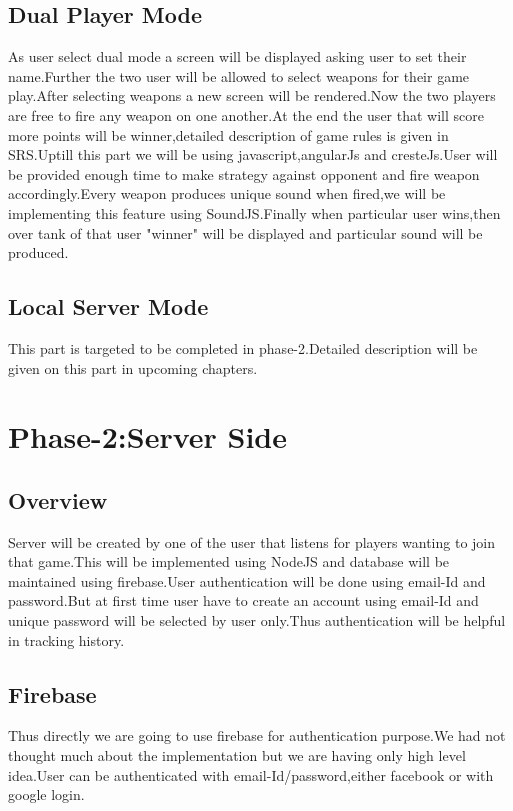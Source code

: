 \documentclass{scrreprt}
\begin{document}
\section{Dual Player Mode}
As user select dual mode a screen will be displayed asking user to set their name.Further the two user will be allowed to select weapons for their game play.After selecting weapons a new screen will be rendered.Now the two players are free to fire any weapon on one another.At the end the user that will score more points will be winner,detailed description of game rules is given in SRS.Uptill this part we will be using javascript,angularJs and cresteJs.User will be provided enough time to make strategy against opponent and fire weapon accordingly.Every weapon produces unique sound when fired,we will be implementing this feature using SoundJS.Finally when particular user wins,then over tank of that user "winner" will be displayed and particular sound will be produced.\\

\section{Local Server Mode}
This part is targeted to be completed in phase-2.Detailed description will be given on this part in upcoming chapters.

\chapter{Phase-2:Server Side}
\section{Overview}
Server will be created by one of the user that listens for players wanting to join that game.This will be implemented using NodeJS and database will be maintained using firebase.User authentication will be done using email-Id and password.But at first time user have to create an account using email-Id and unique password will be selected by user only.Thus authentication will be helpful in tracking history.

\section{Firebase} 
Thus directly we are going to use firebase for authentication purpose.We had not thought much about the implementation but we are having only high level idea.User can be authenticated with email-Id/password,either facebook or with google login.
\end{document}
